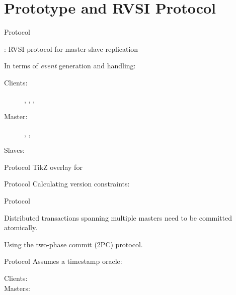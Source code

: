 \section{\chameleon{} Prototype and RVSI Protocol}



\begin{frame}{\rvsims{} Protocol}
  \centerline{\textbf{\rvsims{}}: RVSI protocol for master-slave replication}

  \vspace{1.0cm}
  In terms of \emph{event} generation and handling:
  \begin{description}
    \item[Clients:] \ebegin, \eread, \ewrite, \eend%
    \item[Master:] \estart, \ecommit, \esend%
    \item[Slaves:] \ereceive%
  \end{description}
\end{frame}

\begin{frame}{\rvsims{} Protocol}
  TikZ overlay for \rvsims{}
\end{frame}

\begin{frame}{\rvsims{} Protocol}
  Calculating version constraints:
\end{frame}

\begin{frame}{\rvsimp{} Protocol}
  \begin{center}
    Distributed transactions spanning multiple masters need to be committed atomically.

    \pause
    Using the two-phase commit (2PC) protocol.
  \end{center}
\end{frame}

\begin{frame}{\rvsimp{} Protocol}
  Assumes a timestamp oracle:
  \begin{description}
    \item[Clients:] 
    \item[Masters:]
  \end{description}
\end{frame}

